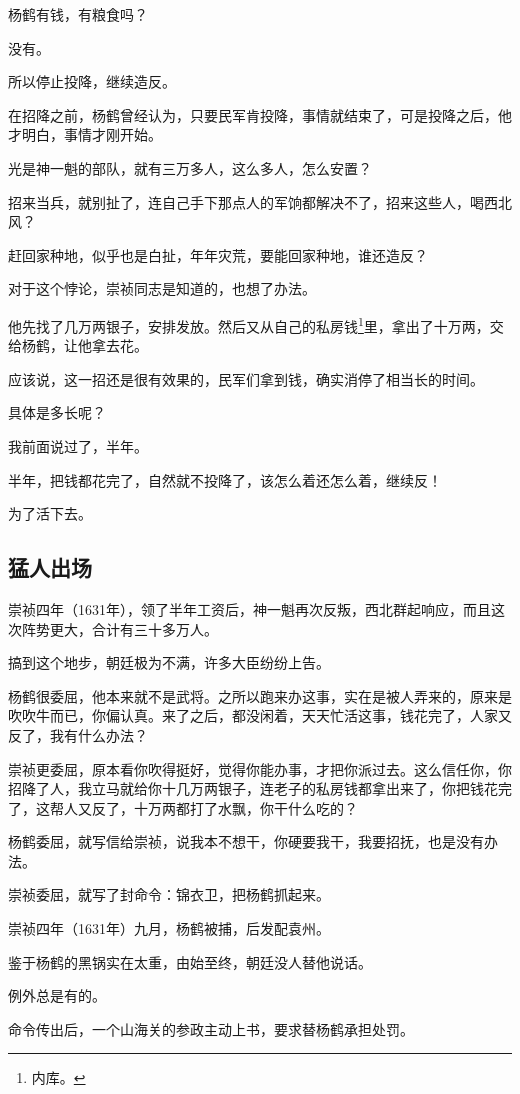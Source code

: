 \begin{multicols}{\theparacolNo}
		杨鹤有钱，有粮食吗？

		没有。

		所以停止投降，继续造反。

		在招降之前，杨鹤曾经认为，只要民军肯投降，事情就结束了，可是投降之后，他才明白，事情才刚开始。

		光是神一魁的部队，就有三万多人，这么多人，怎么安置？

		招来当兵，就别扯了，连自己手下那点人的军饷都解决不了，招来这些人，喝西北风？

		赶回家种地，似乎也是白扯，年年灾荒，要能回家种地，谁还造反？

		对于这个悖论，崇祯同志是知道的，也想了办法。

		他先找了几万两银子，安排发放。然后又从自己的私房钱\footnote{内库。}里，拿出了十万两，交给杨鹤，让他拿去花。

		应该说，这一招还是很有效果的，民军们拿到钱，确实消停了相当长的时间。

		具体是多长呢？

		我前面说过了，半年。

		半年，把钱都花完了，自然就不投降了，该怎么着还怎么着，继续反！

		为了活下去。

		\subsection{猛人出场}
		崇祯四年（1631年），领了半年工资后，神一魁再次反叛，西北群起响应，而且这次阵势更大，合计有三十多万人。

		搞到这个地步，朝廷极为不满，许多大臣纷纷上告。

		杨鹤很委屈，他本来就不是武将。之所以跑来办这事，实在是被人弄来的，原来是吹吹牛而已，你偏认真。来了之后，都没闲着，天天忙活这事，钱花完了，人家又反了，我有什么办法？

		崇祯更委屈，原本看你吹得挺好，觉得你能办事，才把你派过去。这么信任你，你招降了人，我立马就给你十几万两银子，连老子的私房钱都拿出来了，你把钱花完了，这帮人又反了，十万两都打了水飘，你干什么吃的？

		杨鹤委屈，就写信给崇祯，说我本不想干，你硬要我干，我要招抚，也是没有办法。

		崇祯委屈，就写了封命令：锦衣卫，把杨鹤抓起来。

		崇祯四年（1631年）九月，杨鹤被捕，后发配袁州。

		鉴于杨鹤的黑锅实在太重，由始至终，朝廷没人替他说话。

		例外总是有的。

		命令传出后，一个山海关的参政主动上书，要求替杨鹤承担处罚。


\end{multicols}
